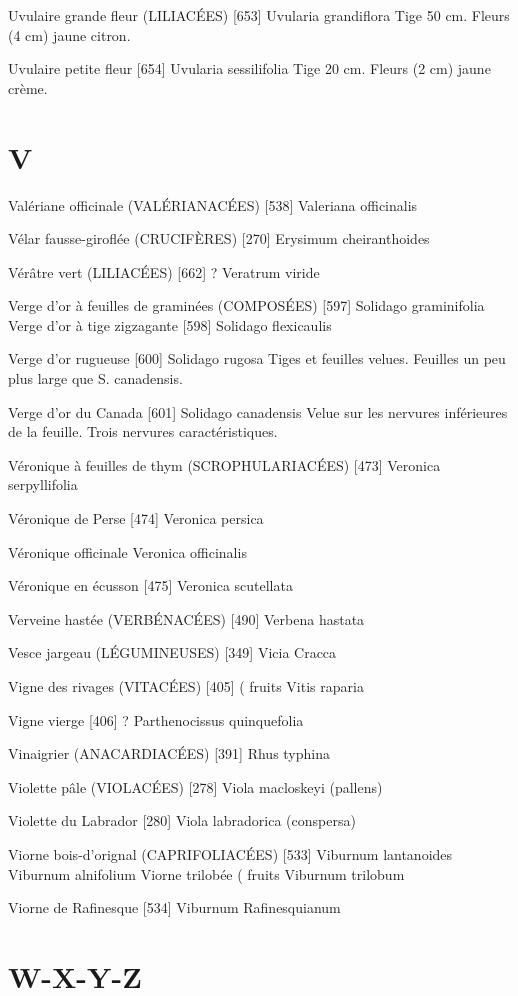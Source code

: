 Uvulaire grande fleur (LILIACÉES)  [653]
				Uvularia grandiflora
Tige 50 cm. Fleurs (4 cm) jaune citron.

Uvulaire petite fleur  [654]
				Uvularia sessilifolia
Tige 20 cm. Fleurs (2 cm) jaune crème.

\chapter*{V}

Valériane officinale (VALÉRIANACÉES)  [538]
				Valeriana officinalis

Vélar fausse-giroflée (CRUCIFÈRES)  [270]
				Erysimum cheiranthoides

Vérâtre vert (LILIACÉES)  [662]						?
				Veratrum viride

Verge d’or à feuilles de graminées (COMPOSÉES)  [597]
				Solidago graminifolia
Verge d’or à tige zigzagante  [598]
				Solidago flexicaulis

Verge d’or rugueuse  [600]
				Solidago rugosa
Tiges et feuilles velues. Feuilles un peu plus large que S. canadensis.

Verge d’or du Canada  [601]
				Solidago canadensis
Velue sur les nervures inférieures de la feuille. Trois nervures caractéristiques.

Véronique à feuilles de thym (SCROPHULARIACÉES)  [473]
				Veronica serpyllifolia

Véronique de Perse  [474]
				Veronica persica

Véronique officinale
				Veronica officinalis

Véronique en écusson  [475]
				Veronica scutellata


Verveine hastée (VERBÉNACÉES)  [490]
				Verbena hastata

Vesce jargeau (LÉGUMINEUSES)  [349]
				Vicia Cracca

Vigne des rivages (VITACÉES)  [405]				( fruits
				Vitis raparia

Vigne vierge  [406]							?
				Parthenocissus quinquefolia

Vinaigrier (ANACARDIACÉES)  [391]
				Rhus typhina

Violette pâle (VIOLACÉES)  [278]
				Viola macloskeyi (pallens)

Violette du Labrador  [280]
				Viola labradorica (conspersa)

Viorne bois-d’orignal (CAPRIFOLIACÉES)  [533]
				Viburnum lantanoides
				Viburnum alnifolium
Viorne trilobée							( fruits
				Viburnum trilobum

Viorne de Rafinesque  [534]
				Viburnum Rafinesquianum

\chapter*{W-X-Y-Z}


	
	
